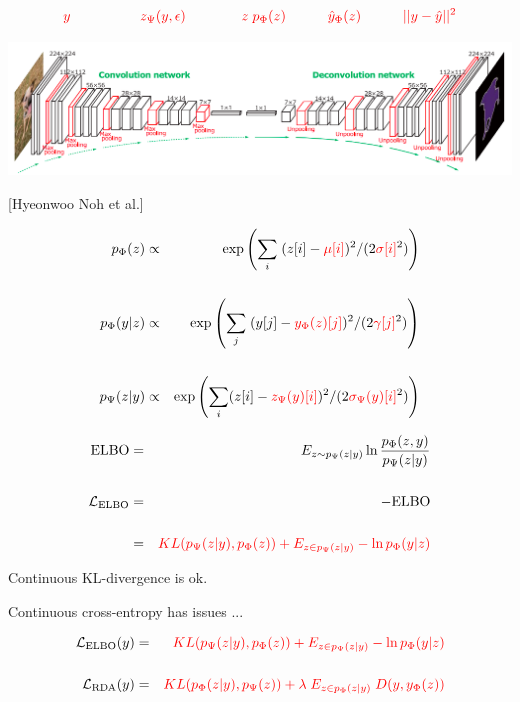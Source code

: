 {\vfill
$${\color{red}y \hspace{5em}  z_\Psi(y,\epsilon) \hspace{4em} z\;p_\Phi(z) \hspace{3em} \hat{y}_\Phi(z) \hspace{3em}||y - \hat{y}||^2}$$
\centerline{\includegraphics[width=9in]{../images/Deconv}}

\centerline{\Large [Hyeonwoo Noh et al.]}


\begin{eqnarray*}
p_\Phi(z) & \propto & \exp\left(\sum_i \;(z[i] - {\color{red} \mu[i]})^2/(2{\color{red} \sigma[i]}^2)\right) \\
\\
p_\Phi(y|z) & \propto & \exp\left(\sum_j\;(y[j] - {\color{red} y_\Phi(z)[j]})^2/(2{\color{red} \gamma[j]}^2)\right) \\
\\
p_\Psi(z|y) & \propto & \exp\left(\sum_i (z[i] - {\color{red} z_\Psi(y)[i]})^2/(2{\color{red} \sigma_\Psi(y)[i]}^2)\right)
\end{eqnarray*}


\begin{eqnarray*}
\mathrm{ELBO} & = & E_{z \sim p_\Psi(z|y)} \ln \frac{p_\Phi(z,y)}{p_\Psi(z|y)} \\
\\
{\cal L}_{\mathrm{ELBO}} & = & - \mathrm{ELBO} \\
\\
& = & {\color{red}  KL(p_\Psi(z|y),p_\Phi(z)) + E_{z \in p_\Psi(z|y)} - \ln p_\Phi(y|z)}
\end{eqnarray*}

\vfill
Continuous KL-divergence is ok.

\vfill
Continuous cross-entropy has issues ...


\begin{eqnarray*}
{\cal L}_{\mathrm{ELBO}}(y) & = & {\color{red}  KL(p_\Psi(z|y),p_\Phi(z)) + E_{z \in p_\Psi(z|y)} - \ln p_\Phi(y|z)} \\
\\
{\cal L}_{\mathrm{RDA}}(y) & = & {\color{red}  KL(p_\Phi(z|y),p_\Psi(z)) + \lambda \; E_{z \in p_\Phi(z|y)}\; D(y,y_\Phi(z))}
\end{eqnarray*}

}
